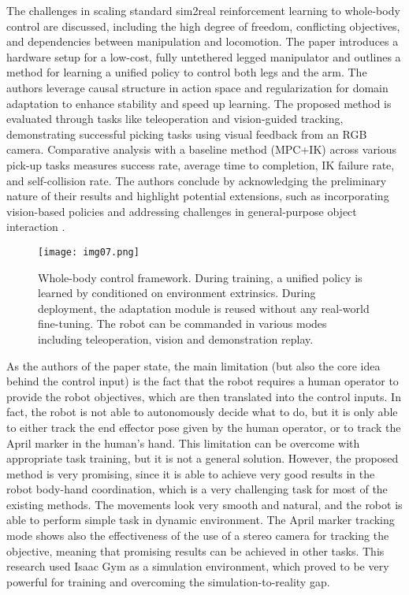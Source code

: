 The challenges in scaling standard sim2real reinforcement learning to whole-body control
are discussed, including the high degree of freedom, conflicting objectives, and dependencies
between manipulation and locomotion. The paper introduces a hardware setup for a low-cost, fully
untethered legged manipulator and outlines a method for learning a unified policy to control
both legs and the arm. The authors leverage causal structure in action space and regularization
for domain adaptation to enhance stability and speed up learning.
The proposed method is evaluated through tasks like teleoperation and vision-guided tracking,
demonstrating successful picking tasks using visual feedback from an RGB camera.
Comparative analysis with a baseline method (MPC+IK) across various pick-up tasks measures success rate,
average time to completion, IK failure rate, and self-collision rate.
The authors conclude by acknowledging the preliminary nature of their results and highlight
potential extensions, such as incorporating vision-based policies and addressing challenges
in general-purpose object interaction \cite{fu2022deeplegged}.

\begin{figure}[H]
	\centering
	\texttt{[image: img07.png]}
	\captionsetup{width=1\linewidth}
	\caption{Whole-body control framework. During training, a unified policy is learned by conditioned on
		environment extrinsics. During deployment, the adaptation module is reused without 
		any real-world fine-tuning.
		The robot can be commanded in various modes including teleoperation, vision and demonstration replay.
		\cite{fu2022deeplegged}}
	\label{fig:img07}
\end{figure}

As the authors of the paper \cite{fu2022deeplegged} state, the main limitation (but also the core
idea behind the control input) is the fact that the robot requires a human operator to
provide the robot objectives, which are then translated into the control inputs. In fact,
the robot is not able to autonomously decide what to do, but it is only able to either track the
end effector pose given by the human operator, or to track the April marker in the human's hand.
This limitation can be overcome with appropriate task training, but it is not a general solution.
However, the proposed method is very promising, since it is able to achieve very good results
in the robot body-hand coordination, which is a very challenging task for most of the existing
methods. The movements look very smooth and natural, and the robot is able to perform
simple task in dynamic environment. The April marker tracking mode shows also the effectiveness of
the use of a stereo camera for tracking the objective, meaning that promising results can be
achieved in other tasks. This research used Isaac Gym as a simulation environment, which 
proved to be very powerful for training and overcoming the simulation-to-reality gap.

